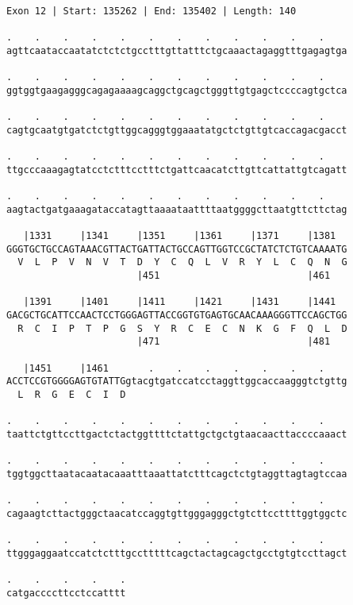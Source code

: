 \documentclass{article}
\begin{document}
\newpage
\begin{Verbatim}
Exon 12 | Start: 135262 | End: 135402 | Length: 140
 
.    .    .    .    .    .    .    .    .    .    .    .    
agttcaataccaatatctctctgcctttgttatttctgcaaactagaggtttgagagtga
  
.    .    .    .    .    .    .    .    .    .    .    .    
ggtggtgaagagggcagagaaaagcaggctgcagctgggttgtgagctccccagtgctca
  
.    .    .    .    .    .    .    .    .    .    .    .    
cagtgcaatgtgatctctgttggcagggtggaaatatgctctgttgtcaccagacgacct
  
.    .    .    .    .    .    .    .    .    .    .    .    
ttgcccaaagagtatcctctttcctttctgattcaacatcttgttcattattgtcagatt
  
.    .    .    .    .    .    .    .    .    .    .    .    
aagtactgatgaaagataccatagttaaaataattttaatggggcttaatgttcttctag
  
   |1331     |1341     |1351     |1361     |1371     |1381  
GGGTGCTGCCAGTAAACGTTACTGATTACTGCCAGTTGGTCCGCTATCTCTGTCAAAATG
  V  L  P  V  N  V  T  D  Y  C  Q  L  V  R  Y  L  C  Q  N  G
                       |451                          |461   
  
   |1391     |1401     |1411     |1421     |1431     |1441  
GACGCTGCATTCCAACTCCTGGGAGTTACCGGTGTGAGTGCAACAAAGGGTTCCAGCTGG
  R  C  I  P  T  P  G  S  Y  R  C  E  C  N  K  G  F  Q  L  D
                       |471                          |481   
  
   |1451     |1461       .    .    .    .    .    .    .    
ACCTCCGTGGGGAGTGTATTGgtacgtgatccatcctaggttggcaccaagggtctgttg
  L  R  G  E  C  I  D                                       
  
.    .    .    .    .    .    .    .    .    .    .    .    
taattctgttccttgactctactggttttctattgctgctgtaacaacttaccccaaact
  
.    .    .    .    .    .    .    .    .    .    .    .    
tggtggcttaatacaatacaaatttaaattatctttcagctctgtaggttagtagtccaa
  
.    .    .    .    .    .    .    .    .    .    .    .    
cagaagtcttactgggctaacatccaggtgttgggagggctgtcttccttttggtggctc
  
.    .    .    .    .    .    .    .    .    .    .    .    
ttgggaggaatccatctctttgcctttttcagctactagcagctgcctgtgtccttagct
  
.    .    .    .    .
catgaccccttcctccatttt
\end{Verbatim}
\newpage
\end{document}
